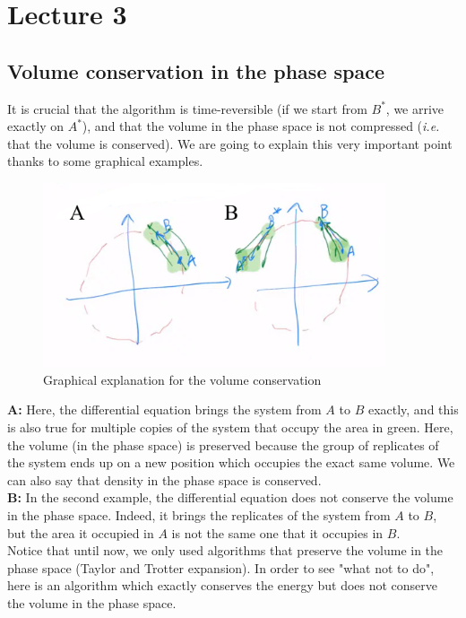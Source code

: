 \section{Lecture 3}

\subsection{Volume conservation in the phase space} 
It is crucial that the algorithm is time-reversible (if we start from $B^{*}$, we arrive exactly on $A^{*}$), and that the volume in the phase space is not compressed (\textit{i.e.} that the volume is conserved).
We are going to explain this very important point thanks to some graphical examples.

    \begin{figure}[H]
        \centering
        \includegraphics[width=0.9\textwidth]{Monte Carlo/images/lect3/graphex}
        \caption{Graphical explanation for the volume conservation}
        \label{fig:verlet_freepart}
    \end{figure}

\noindent \textbf{A:} Here, the differential equation brings the system from $A$ to $B$ exactly, and this is also true for multiple copies of the system that occupy the area in green. Here, the volume (in the phase space) is preserved because the group of replicates of the system ends up on a new position which occupies the exact same volume. We can also say that density in the phase space is conserved.\\
\textbf{B:} In the second example, the differential equation does not conserve the volume in the phase space. Indeed, it brings the replicates of the system from $A$ to $B$, but the area it occupied in $A$ is not the same one that it occupies in $B$. \\ 
Notice that until now, we only used algorithms that preserve the volume in the phase space (Taylor and Trotter expansion). In order to see "what not to do", here is an algorithm which exactly conserves the energy but does not conserve the volume in the phase space. 

